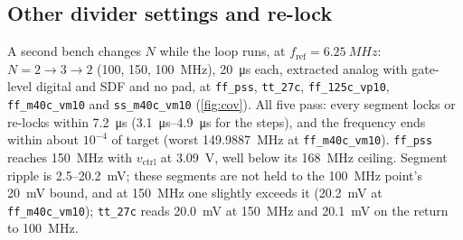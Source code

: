 \documentclass[10pt,twocolumn,letterpaper]{article}
\newcommand{\code}[1]{\texttt{\small #1}}
\begin{document}
\subsection{Other divider settings and re-lock}
A second bench changes $N$ while the loop runs, at
$f_\text{ref}=\SI{6.25}{MHz}$: $N=2\to3\to2$ (\SI{100}{}, \SI{150}{},
\SI{100}{MHz}), \SI{20}{\micro s} each, extracted analog with gate-level
digital and SDF and no pad, at \code{ff\_pss}, \code{tt\_27c},
\code{ff\_125c\_vp10}, \code{ff\_m40c\_vm10} and \code{ss\_m40c\_vm10}
(\cref{fig:cov}). All five pass: every segment locks or re-locks within
\SI{7.2}{\micro s} (\SIrange{3.1}{4.9}{\micro s} for the steps), and the
frequency ends within about $10^{-4}$ of target (worst
\SI{149.9887}{MHz} at \code{ff\_m40c\_vm10}). \code{ff\_pss} reaches
\SI{150}{MHz} with $v_\text{ctrl}$ at \SI{3.09}{V}, well below its
\SI{168}{MHz} ceiling. Segment ripple is 2.5--\SI{20.2}{mV}; these segments
are not held to the \SI{100}{MHz} point's \SI{20}{mV} bound, and at
\SI{150}{MHz} one slightly exceeds it (\SI{20.2}{mV} at
\code{ff\_m40c\_vm10}); \code{tt\_27c} reads \SI{20.0}{mV} at
\SI{150}{MHz} and \SI{20.1}{mV} on the return to \SI{100}{MHz}.
\end{document}
